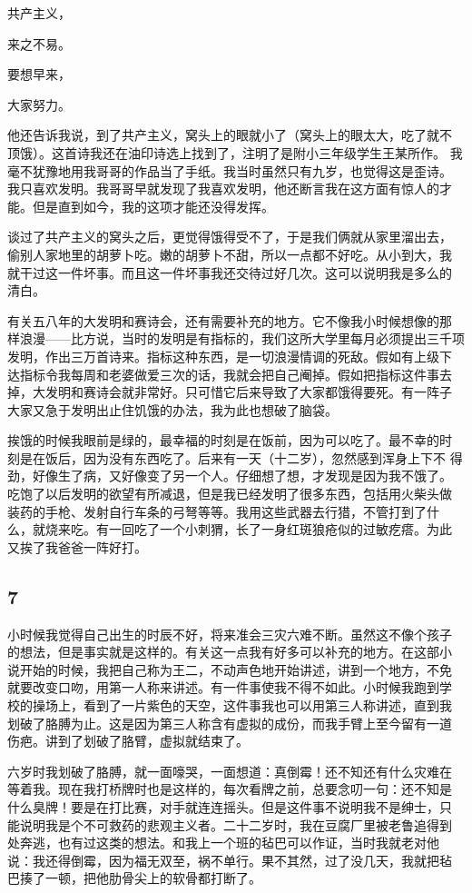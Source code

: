 共产主义， 

来之不易。 

要想早来， 

大家努力。 

他还告诉我说，到了共产主义，窝头上的眼就小了（窝头上的眼太大，吃了就不
顶饿）。这首诗我还在油印诗选上找到了，注明了是附小三年级学生王某所作。
我毫不犹豫地用我哥哥的作品当了手纸。我当时虽然只有九岁，也觉得这是歪诗。
我只喜欢发明。我哥哥早就发现了我喜欢发明，他还断言我在这方面有惊人的才
能。但是直到如今，我的这项才能还没得发挥。

谈过了共产主义的窝头之后，更觉得饿得受不了，于是我们俩就从家里溜出去，
偷别人家地里的胡萝卜吃。嫩的胡萝卜不甜，所以一点都不好吃。从小到大，我
就干过这一件坏事。而且这一件坏事我还交待过好几次。这可以说明我是多么的
清白。

有关五八年的大发明和赛诗会，还有需要补充的地方。它不像我小时候想像的那
样浪漫——比方说，当时的发明是有指标的，我们这所大学里每月必须提出三千项
发明，作出三万首诗来。指标这种东西，是一切浪漫情调的死敌。假如有上级下
达指标令我每周和老婆做爱三次的话，我就会把自己阉掉。假如把指标这件事去
掉，大发明和赛诗会就非常好。只可惜它后来导致了大家都饿得要死。有一阵子
大家又急于发明出止住饥饿的办法，我为此也想破了脑袋。

挨饿的时候我眼前是绿的，最幸福的时刻是在饭前，因为可以吃了。最不幸的时
刻是在饭后，因为没有东西吃了。后来有一天（十二岁），忽然感到浑身上下不
得劲，好像生了病，又好像变了另一个人。仔细想了想，才发现是因为我不饿了。
吃饱了以后发明的欲望有所减退，但是我已经发明了很多东西，包括用火柴头做
装药的手枪、发射自行车条的弓弩等等。我用这些武器去行猎，不管打到了什
么，就烧来吃。有一回吃了一个小刺猬，长了一身红斑狼疮似的过敏疙瘩。为此
又挨了我爸爸一阵好打。

\subsection{7} 

小时候我觉得自己出生的时辰不好，将来准会三灾六难不断。虽然这不像个孩子
的想法，但是事实就是这样的。有关这一点我有好多可以补充的地方。在这部小
说开始的时候，我把自己称为王二，不动声色地开始讲述，讲到一个地方，不免
就要改变口吻，用第一人称来讲述。有一件事使我不得不如此。小时候我跑到学
校的操场上，看到了一片紫色的天空，这件事我也可以用第三人称讲述，直到我
划破了胳膊为止。这是因为第三人称含有虚拟的成份，而我手臂上至今留有一道
伤疤。讲到了划破了胳臂，虚拟就结束了。

六岁时我划破了胳膊，就一面嚎哭，一面想道：真倒霉！还不知还有什么灾难在
等着我。现在我打桥牌时也是这样的，每次看牌之前，总要念叨一句：还不知是
什么臭牌！要是在打比赛，对手就连连摇头。但是这件事不说明我不是绅士，只
能说明我是个不可救药的悲观主义者。二十二岁时，我在豆腐厂里被老鲁追得到
处奔逃，也有过这类的想法。和我上一个班的毡巴可以作证，当时我就老对他
说：我还得倒霉，因为福无双至，祸不单行。果不其然，过了没几天，我就把毡
巴揍了一顿，把他肋骨尖上的软骨都打断了。

